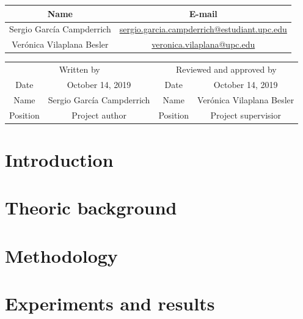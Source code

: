 \documentclass[a4paper,12pt,titlepage]{article}
\begin{document}
\begin{center}
\begin{tabular}{*2c}
\toprule
Name & E-mail \\
\midrule
Sergio García Campderrich & \url{sergio.garcia.campderrich@estudiant.upc.edu} \\
Verónica Vilaplana Besler & \url{veronica.vilaplana@upc.edu} \\
\bottomrule
\end{tabular}
\end{center}

\begin{center}
\begin{tabular}{*4c}
\toprule
\multicolumn{2}{c}{Written by} & \multicolumn{2}{c}{Reviewed and approved by}\\
Date & October 14, 2019 & Date & October 14, 2019 \\
\midrule
Name & Sergio García Campderrich & Name & Verónica Vilaplana Besler \\
Position & Project author & Position & Project supervisior \\
\bottomrule
\end{tabular}
\end{center}

\tableofcontents

\listoffigures

\listoftables

\printglossary[type=\acronymtype,title=Acronyms]

\newpage
{}

\section{Introduction}\label{sec:introduction}


\section{Theoric background}\label{sec:theoric-background}


\section{Methodology}\label{sec:methodology}


\section{Experiments and results}\label{sec:experiments-and-results}

\end{document}
